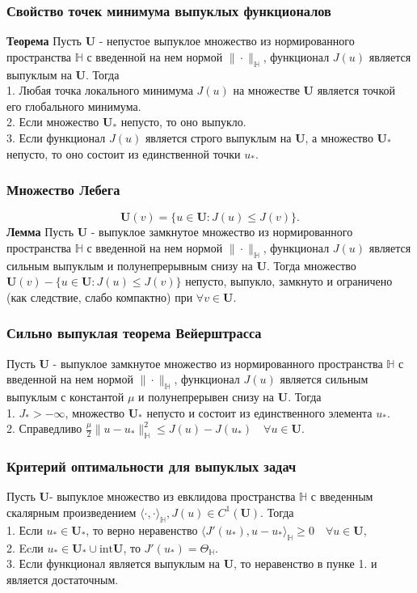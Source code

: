 \documentclass[A4]{article}
\begin{document}
\subsubsection{Свойство точек минимума выпуклых функционалов}
\textbf{Теорема} Пусть $\mathbf{U}$ - непустое выпуклое множество из нормированного пространства $\mathbb{H}$ с введенной на нем нормой $\|\cdot\|_{\mathbb{H}}$, функционал $J(u)$ является выпуклым на $\mathbf{U}$. Тогда\\
1. Любая точка локального минимума $J(u)$ на множестве $\mathbf{U}$ является точкой его глобального минимума.\\
2. Если множество $\mathbf{U}_{*}$ непусто, то оно выпукло.\\
3. Если функционал $J(u)$ является строго выпуклым на $\mathbf{U}$, а множество $\mathbf{U}_{*}$ непусто, то оно состоит из единственной точки $u_*$.
\subsubsection{Множество Лебега}
\begin{equation*}
\mathbf{U}(v)=\{u\in\mathbf{U}:J(u)\leqslant J(v)\}.
\end{equation*}
\textbf{Лемма} Пусть $\mathbf{U}$ - выпуклое замкнутое множество из нормированного пространства $\mathbb{H}$ с введенной на нем нормой $\|\cdot\|_{\mathbb{H}}$, функционал $J(u)$ является сильным выпуклым и полунепрерывным снизу на $\mathbf{U}$. Тогда множество $\mathbf{U}(v)-\{u\in\mathbf{U}:J(u)\leqslant J(v)\}$ непусто, выпукло, замкнуто и ограничено (как следствие, слабо компактно) при $\forall v\in\mathbf{U}$.
\subsubsection{Сильно выпуклая теорема Вейерштрасса}
Пусть $\mathbf{U}$ - выпуклое замкнутое множество из нормированного пространства $\mathbb{H}$ с введенной на нем нормой $\|\cdot\|_{\mathbb{H}}$, функционал $J(u)$ является сильным выпуклым с константой $\mu$ и полунепрерывен снизу на $\mathbf{U}$. Тогда\\
1. $J_*>-\infty$, множество $\mathbf{U}_{*}$ непусто и состоит из единственного элемента $u_*$.\\
2. Справедливо $\frac{\mu}{2}\|u-u_*\|^2_{\mathbb{H}}\leqslant J(u)-J(u_*)\quad\forall u\in\mathbf{U}$.
\subsubsection{Критерий оптимальности для выпуклых задач}
Пусть $\mathbf{U}$- выпуклое множество из евклидова пространства $\mathbb{H}$ с введенным скалярным произведением $\langle\cdot,\cdot\rangle_{\mathbb{H}},J(u)\in C^1(\mathbf{U})$. Тогда\\
1. Если $u_*\in \mathbf{U}_{*}$, то верно неравенство $\langle J'(u_*),u-u_*\rangle_{\mathbb{H}}\geqslant 0\quad \forall u\in\mathbf{U}$,\\
2. Ecли $u_*\in\mathbf{U}_{*}\cup\text{int}\mathbf{U}$, то $J'(u_*)=\Theta_{\mathbb{H}}$.\\
3. Если функционал является выпуклым на $\mathbf{U}$, то неравенство в пунке 1. и является достаточным.
\end{document}
